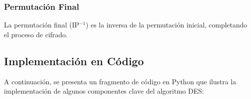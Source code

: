 



\subsubsection{Permutación Final}

La permutación final (IP$^{-1}$) es la inversa de la permutación inicial, completando el proceso de cifrado.


\subsection{Implementación en Código}

A continuación, se presenta un fragmento de código en Python que ilustra la implementación de algunos componentes clave del algoritmo DES:

